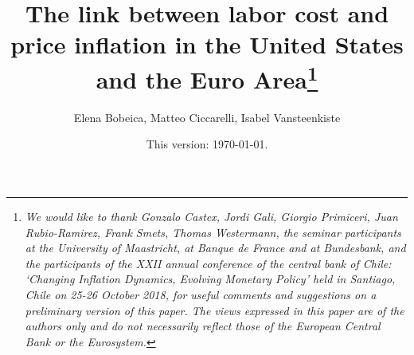 \documentclass[11pt]{article}
\begin{document}
\author[1]{Elena Bobeica, Matteo Ciccarelli, Isabel Vansteenkiste}
\title{The link between labor cost and price inflation in the United States and the Euro Area\thanks{
\vspace{-1ex} \textit{We would like to thank Gonzalo Castex, Jordi Gali, Giorgio Primiceri, Juan Rubio-Ramirez, Frank Smets, Thomas Westermann, the seminar participants at the University of Maastricht, at Banque de France and at Bundesbank, and the participants of the XXII annual conference of the central bank of Chile: `Changing Inflation Dynamics, Evolving Monetary Policy' held in Santiago, Chile on 25-26 October 2018, for useful comments and suggestions on a preliminary version of this paper. The views expressed in this paper are of the authors only and do not necessarily reflect those of the European Central Bank or the Eurosystem.}}}

\date{This version: \today. 
}
\maketitle


\maketitle
\end{document}
